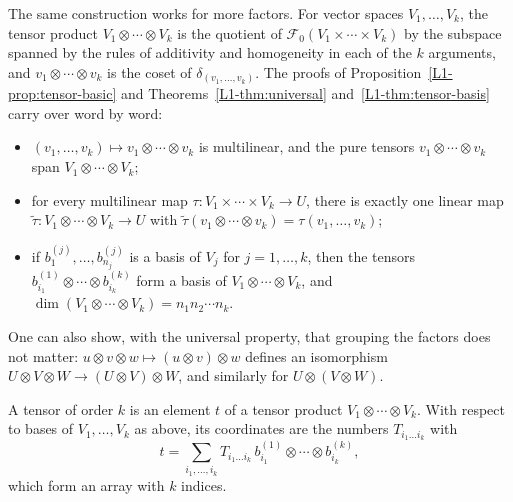The same construction works for more factors. For vector spaces $V_1, \ldots, V_k$, the tensor product $V_1 \otimes \cdots \otimes V_k$ is the quotient of $\mathcal{F}_0(V_1 \times \cdots \times V_k)$ by the subspace spanned by the rules of additivity and homogeneity in each of the $k$ arguments, and $v_1 \otimes \cdots \otimes v_k$ is the coset of $\delta_{(v_1, \ldots, v_k)}$. The proofs of Proposition~\ref{L1-prop:tensor-basic} and Theorems~\ref{L1-thm:universal} and~\ref{L1-thm:tensor-basis} carry over word by word:
\begin{itemize}
    \item $(v_1, \ldots, v_k) \mapsto v_1 \otimes \cdots \otimes v_k$ is multilinear, and the pure tensors $v_1 \otimes \cdots \otimes v_k$ span $V_1 \otimes \cdots \otimes V_k$;
    \item for every multilinear map $\tau: V_1 \times \cdots \times V_k \to U$, there is exactly one linear map $\tilde\tau: V_1 \otimes \cdots \otimes V_k \to U$ with $\tilde\tau(v_1 \otimes \cdots \otimes v_k) = \tau(v_1, \ldots, v_k)$;
    \item if $b^{(j)}_1, \ldots, b^{(j)}_{n_j}$ is a basis of $V_j$ for $j = 1, \ldots, k$, then the tensors $b^{(1)}_{i_1} \otimes \cdots \otimes b^{(k)}_{i_k}$ form a basis of $V_1 \otimes \cdots \otimes V_k$, and $\dim(V_1 \otimes \cdots \otimes V_k) = n_1 n_2 \cdots n_k$.
\end{itemize}
One can also show, with the universal property, that grouping the factors does not matter: $u \otimes v \otimes w \mapsto (u \otimes v) \otimes w$ defines an isomorphism $U \otimes V \otimes W \to (U \otimes V) \otimes W$, and similarly for $U \otimes (V \otimes W)$.

\begin{definition}[Tensor]\label{L1-def:tensor}
    A tensor of order $k$ is an element $t$ of a tensor product $V_1 \otimes \cdots \otimes V_k$. With respect to bases of $V_1, \ldots, V_k$ as above, its coordinates are the numbers $T_{i_1 \ldots i_k}$ with
    \[t = \sum_{i_1, \ldots, i_k} T_{i_1 \ldots i_k}\, b^{(1)}_{i_1} \otimes \cdots \otimes b^{(k)}_{i_k},\]
    which form an array with $k$ indices.
\end{definition}

